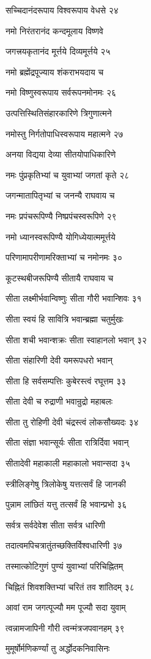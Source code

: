 सच्चिदानंदरूपाय विश्वरूपाय वेधसे २४

नमो निरंतरानंद कन्दमूलाय विष्णवे

जगत्त्रयकृतानंद मूर्त्तये दिव्यमूर्त्तये २५

नमो ब्रह्मेंद्रपूज्याय शंकराभयदाय च

नमो विष्णुस्वरूपाय सर्वरूपनमोनमः २६

उत्पत्तिस्थितिसंहारकारिणे त्रिगुणात्मने

नमोस्तु निर्गतोपाधिस्वरूपाय महात्मने २७

अनया विद्यया देव्या सीतयोपाधिकारिणे

नमः पुंप्रकृतिभ्यां च युवाभ्यां जगतां कृते २८

जगन्मातापितृभ्यां च जनन्यै राघवाय च

नमः प्रपंचरूपिण्यै निष्प्रपंचस्वरूपिणे २९

नमो ध्यानस्वरूपिण्यै योगिध्येयात्ममूर्त्तये

परिणामापरीणामरिक्ताभ्यां च नमोनमः ३०

कूटस्थबीजरूपिण्यै सीतायै राघवाय च

सीता लक्ष्मीर्भवान्विष्णुः सीता गौरी भवान्शिवः ३१

सीता स्वयं हि सावित्रि भवान्ब्रह्मा चतुर्मुखः

सीता शची भवान्शक्रः सीता स्वाहानलो भवान् ३२

सीता संहारिणी देवी यमरूपधरो भवान्

सीता हि सर्वसम्पत्तिः कुबेरस्त्वं रघूत्तम ३३

सीता देवी च रुद्राणी भवान्रुद्रो महाबलः

सीता तु रोहिणी देवी चंद्रस्त्वं लोकसौख्यदः ३४

सीता संज्ञा भवान्सूर्यः सीता रात्रिर्दिवा भवान्

सीतादेवी महाकाली महाकालो भवान्सदा ३५

स्त्रीलिङ्गेषु त्रिलोकेषु यत्तत्सर्वं हि जानकी

पुन्नाम लांछितं यत्तु तत्सर्वं हि भवान्प्रभो ३६

सर्वत्र सर्वदेवेश सीता सर्वत्र धारिणी

तदात्वमपिचत्रातुंतच्छक्तिर्विश्वधारिणी ३७

तस्मात्कोटिगुणं पुण्यं युवाभ्यां परिचिह्नितम्

चिह्नितं शिवशक्तिभ्यां चरितं तव शांतिदम् ३८

आवां राम जगत्पूज्यौ मम पूज्यौ सदा युवाम्

त्वन्नामजापिनी गौरी त्वन्मंत्रजपवानहम् ३९

मुमूर्षोर्मणिकर्ण्यां तु अर्द्धोदकनिवासिनः

